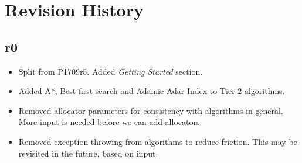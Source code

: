 \section{Revision History}

\subsection*{\paperno r0}

\begin{itemize}
      \item Split from P1709r5. Added \textit{Getting Started} section.
      \item Added A*, Best-first search and Adamic-Adar Index to Tier 2 algorithms.
      \item Removed allocator parameters for consistency with algorithms in general. More input is needed before we can add allocators.
      \item Removed exception throwing from algorithms to reduce friction. 
            This may be revisited in the future, based on input.
\end{itemize}
